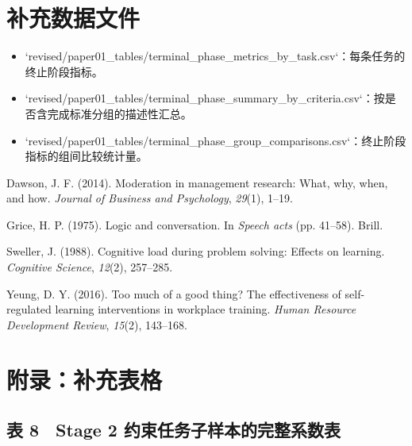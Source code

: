 \documentclass[12pt,a4paper,openany,oneside]{ctexrep}
\begin{document}
\section{补充数据文件}


\begin{itemize}
\item `revised/paper01\_tables/terminal\_phase\_metrics\_by\_task.csv`：每条任务的终止阶段指标。

\item `revised/paper01\_tables/terminal\_phase\_summary\_by\_criteria.csv`：按是否含完成标准分组的描述性汇总。

\item `revised/paper01\_tables/terminal\_phase\_group\_comparisons.csv`：终止阶段指标的组间比较统计量。
\end{itemize}


Dawson, J. F. (2014). Moderation in management research: What, why, when, and how. \emph{Journal of Business and Psychology}, \emph{29}(1), 1–19.

Grice, H. P. (1975). Logic and conversation. In \emph{Speech acts} (pp. 41–58). Brill.

Sweller, J. (1988). Cognitive load during problem solving: Effects on learning. \emph{Cognitive Science}, \emph{12}(2), 257–285.

Yeung, D. Y. (2016). Too much of a good thing? The effectiveness of self-regulated learning interventions in workplace training. \emph{Human Resource Development Review}, \emph{15}(2), 143–168.

\section{附录：补充表格}


\subsection{表 8　Stage 2 约束任务子样本的完整系数表}


\begin{table}[htbp]
\centering
\caption{表 8：Stage 2 约束任务子样本的完整系数表}
\small
{}
\end{table}
\end{document}
